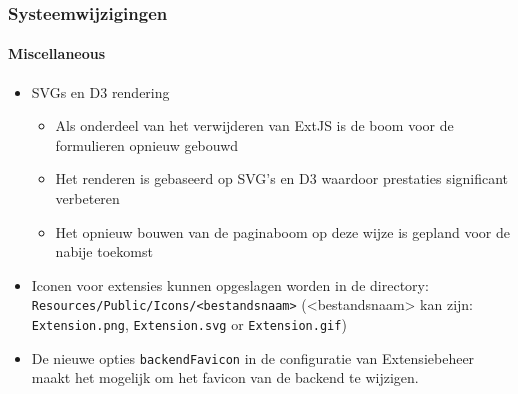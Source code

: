 \begin{frame}[fragile]
	\frametitle{Systeemwijzigingen}
	\framesubtitle{Miscellaneous}

	\begin{itemize}

		\item SVGs en D3 rendering

			\begin{itemize}
				\item Als onderdeel van het verwijderen van ExtJS is de boom voor de formulieren opnieuw gebouwd
				\item Het renderen is gebaseerd op SVG's en D3 waardoor prestaties significant verbeteren
				\item Het opnieuw bouwen van de paginaboom op deze wijze is gepland voor de nabije toekomst
			\end{itemize}

		\item Iconen voor extensies kunnen opgeslagen worden in de directory:\newline
			\small
				\texttt{Resources/Public/Icons/<bestandsnaam>}
				(<bestandsnaam> kan zijn: \texttt{Extension.png}, \texttt{Extension.svg} or \texttt{Extension.gif})
			\normalsize

		\item De nieuwe opties \texttt{backendFavicon} in de configuratie van Extensiebeheer maakt het mogelijk om het favicon
			van de backend te wijzigen.

	\end{itemize}

\end{frame}

